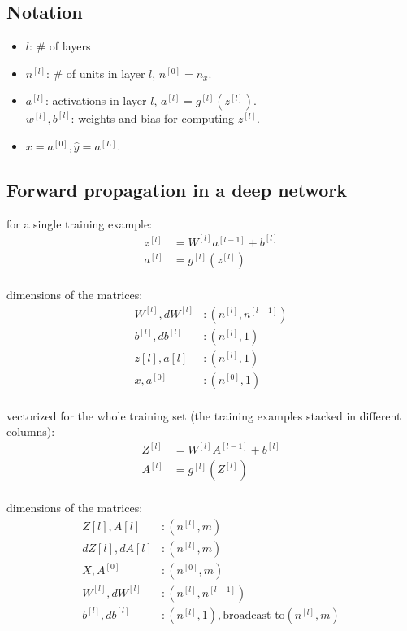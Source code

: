 %
\subsection{Notation}
\begin{itemize}
\item
$l$: \# of layers
\item
$n^{[l]}$: \# of units in layer $l$, $n^{[0]} = n_x$.
\item
$a^{[l]}$: activations in layer $l$, $a^{[l]} = g^{[l]}(z^{[l]})$.\\
$w^{[l]}, b^{[l]}$: weights and bias for computing $z^{[l]}$.
\item
$x = a^{[0]}, \hat{y} = a^{[L]}$.
\end{itemize}

%
\subsection{Forward propagation in a deep network}
for a single training example:
\begin{align}
z^{[l]} &= W^{[l]}a^{[l-1]} + b^{[l]}\\
a^{[l]} &= g^{[l]}(z^{[l]})
\end{align}
\\
dimensions of the matrices:
\begin{align*}
W^{[l]}, dW^{[l]}&: (n^{[l]}, n^{[l-1]})\\
b^{[l]}, db^{[l]} &: (n^{[l]}, 1)\\
z{[l]}, a{[l]} &: (n^{[l]}, 1)\\
x, a^{[0]}&: (n^{[0]}, 1)
\end{align*}
\\
vectorized for the whole training set (the training examples stacked in different columns):
\begin{align}
Z^{[l]} &= W^{[l]}A^{[l-1]} + b^{[l]}\\
A^{[l]} &= g^{[l]}(Z^{[l]})
\end{align}
\\
dimensions of the matrices:
\begin{align*}
Z{[l]}, A{[l]}&: (n^{[l]}, m)\\
dZ{[l]}, dA{[l]}&: (n^{[l]}, m)\\
X, A^{[0]}&: (n^{[0]}, m)\\
W^{[l]}, dW^{[l]}&: (n^{[l]}, n^{[l-1]})\\
b^{[l]}, db^{[l]} &: (n^{[l]}, 1), \text{broadcast to}  (n^{[l]}, m)
\end{align*}

